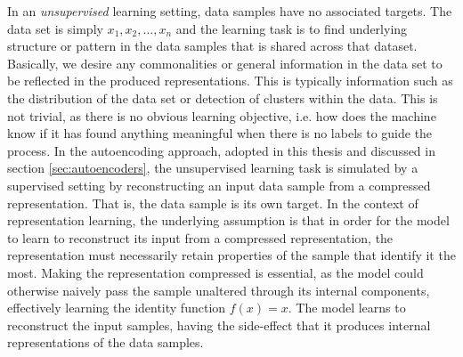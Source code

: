 In an \textit{unsupervised} learning setting, data samples have no associated targets. The data set is simply $x_1, x_2, \ldots, x_n$ and the learning task is to find underlying structure or pattern in the data samples that is shared across that dataset. Basically, we desire any commonalities or general information in the data set to be reflected in the produced representations. This is typically information such as the distribution of the data set or detection of clusters within the data. This is not trivial, as there is no obvious learning objective, i.e. how does the machine know if it has found anything meaningful when there is no labels to guide the process. In the autoencoding approach, adopted in this thesis and discussed in section \ref{sec:autoencoders}, the unsupervised learning task is simulated by a supervised setting by reconstructing an input data sample from a compressed representation. That is, the data sample is its own target. In the context of representation learning, the underlying assumption is that in order for the model to learn to reconstruct its input from a compressed representation, the representation must necessarily retain properties of the sample that identify it the most. Making the representation compressed is essential, as the model could otherwise naively pass the sample unaltered through its internal components, effectively learning the identity function $f(x) = x$. The model learns to reconstruct the input samples, having the side-effect that it produces internal representations of the data samples. 



